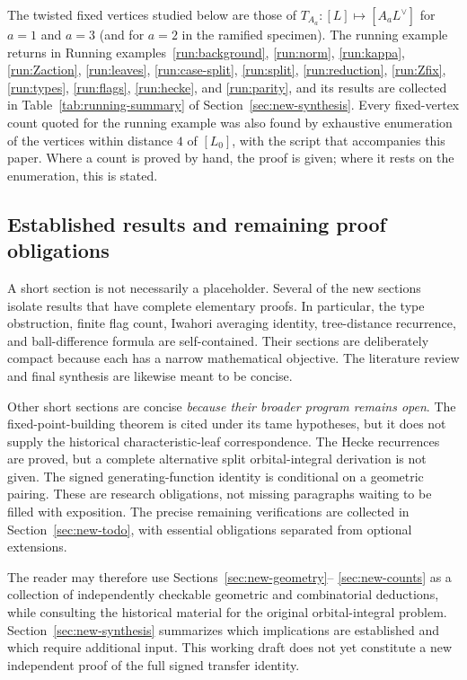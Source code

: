 \documentclass[12pt,letterpaper]{amsart}
\numberwithin{equation}{section}
\theoremstyle{definition}
\theoremstyle{plain}
\begin{document}
The twisted fixed vertices studied below are those of
$T_{A_a}:[L]\mapsto[A_aL^\vee]$ for $a=1$ and $a=3$ (and for $a=2$ in
the ramified specimen). The running example returns in
Running examples~\ref{run:background}, \ref{run:norm}, \ref{run:kappa},
\ref{run:Zaction}, \ref{run:leaves}, \ref{run:case-split},
\ref{run:split}, \ref{run:reduction}, \ref{run:Zfix}, \ref{run:types},
\ref{run:flags}, \ref{run:hecke}, and \ref{run:parity}, and its results are collected in
Table~\ref{tab:running-summary} of Section~\ref{sec:new-synthesis}.
Every fixed-vertex count quoted for the running example was also found
by exhaustive enumeration of the vertices within distance $4$ of
$[L_0]$, with the script
 that accompanies this
paper. Where a count is proved by hand, the proof is given; where it
rests on the enumeration, this is stated.

\subsection{Established results and remaining proof obligations}
\label{sec:intro-proof-status}

A short section is not necessarily a placeholder. Several of the
new sections isolate results that have complete elementary proofs.
In particular, the type obstruction, finite flag count, Iwahori
averaging identity, tree-distance recurrence, and ball-difference
formula are self-contained. Their sections are deliberately compact
because each has a narrow mathematical objective. The literature
review and final synthesis are likewise meant to be concise.

Other short sections are concise \emph{because their broader
program remains open}. The fixed-point-building theorem is cited
under its tame hypotheses, but it does not supply the historical
characteristic-leaf correspondence. The Hecke recurrences are
proved, but a complete alternative split orbital-integral
derivation is not given. The signed generating-function identity
is conditional on a geometric pairing. These are research
obligations, not missing paragraphs waiting to be filled with
exposition. The precise remaining verifications are collected in
Section~\ref{sec:new-todo}, with essential obligations
separated from optional extensions.

The reader may therefore use Sections~\ref{sec:new-geometry}--
\ref{sec:new-counts} as a collection of independently checkable
geometric and combinatorial deductions, while consulting the
historical material for the original orbital-integral problem.
Section~\ref{sec:new-synthesis} summarizes which implications
are established and which require additional input. This working
draft does not yet constitute a new independent proof of the full
signed transfer identity.
\end{document}
